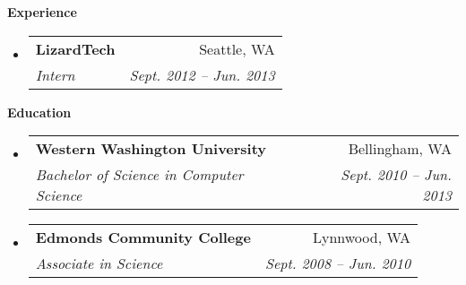 \documentclass[letterpaper,11pt]{article}
\makeatletter
\newcommand{\resheading}[1]{{\large \colorbox{mygrey}{\begin{minipage}{\textwidth}{\textbf{#1 \vphantom{p\^{E}}}}\end{minipage}}}}
\newcommand{\ressubheading}[4]{
\begin{tabular*}{6.5in}{l@{\extracolsep{\fill}}r}
		\textbf{#1} & #2 \\
		\textit{#3} & \textit{#4} \\
\end{tabular*}\vspace{-6pt}}
\makeatother
\begin{document}
\resheading{Experience}
	\begin{itemize}
		\item 
			\ressubheading{{LizardTech }}{Seattle, WA}{Intern}{Sept. 2012 -- Jun. 2013}


	\end{itemize}  %
	
\resheading{Education}
	\begin{itemize}
		\item
			\ressubheading{{Western Washington University}}{Bellingham, WA}{{Bachelor of Science in Computer Science}}{Sept. 2010 -- Jun. 2013}
			
		\item
			\ressubheading{{Edmonds Community College}}{Lynnwood, WA}{{Associate in Science}}{Sept. 2008 -- Jun. 2010}

	\end{itemize} %
\end{document}
